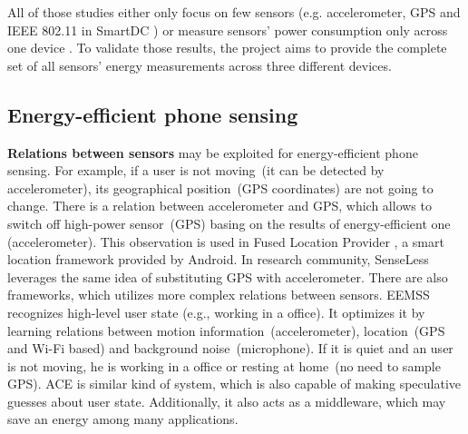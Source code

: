 All of those studies either only focus on few sensors (e.g. accelerometer, GPS and IEEE 802.11 in SmartDC \cite{chon:smartdc}) or measure sensors' power consumption only across one device \cite{benabdesslem:senseless}. To validate those results, the project aims to provide the complete set of all sensors' energy measurements across three different devices. 
	
\subsection{Energy-efficient phone sensing}
\hspace{10pt} \textbf{Relations between sensors} may be exploited for energy-efficient phone sensing. For example, if a user is not moving\ (it can be detected by accelerometer), its geographical position\ (GPS coordinates) are not going to change. There is a relation between accelerometer and GPS, which allows to switch off high-power sensor\ (GPS) basing on the results of energy-efficient one (accelerometer). This observation is used in Fused Location Provider \cite{android:locationapi}, a smart location framework provided by Android. In research community, SenseLess \cite{benabdesslem:senseless} leverages the same idea of substituting GPS with accelerometer. There are also frameworks, which utilizes more complex relations between sensors. EEMSS \cite{wang:eemss} recognizes high-level user state (e.g., working in a office). It optimizes it by learning relations between motion information\ (accelerometer), location\ (GPS and Wi-Fi based) and background noise\ (microphone). If it is quiet and an user is not moving, he is working in a office or resting at home\ (no need to sample GPS). ACE \cite{nath:ace} is similar kind of system, which is also capable of making speculative guesses about user state. Additionally, it also acts as a middleware, which may save an energy among many applications.

